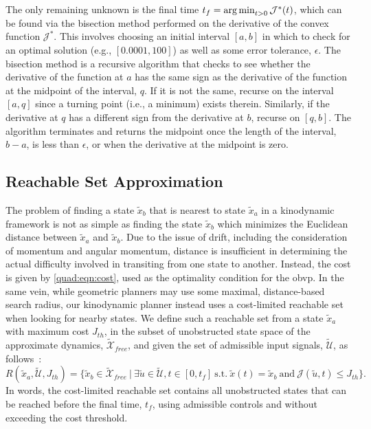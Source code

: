 The only remaining unknown is the final time $t_f = \operatorname*{arg\,min}_{t > 0} \mathcal{J}^*(t)$, which can be found via the bisection method performed on the derivative of the convex function $\mathcal{J}^*$. This involves choosing an initial interval $[a,b]$ in which to check for an optimal solution (e.g., $[0.0001, 100]$) as well as some error tolerance, $\epsilon$. The bisection method is a recursive algorithm that checks to see whether the derivative of the function at $a$ has the same sign as the derivative of the function at the midpoint of the interval, $q$. If it is not the same, recurse on the interval $[a,q]$ since a turning point (i.e., a minimum) exists therein. Similarly, if the derivative at $q$ has a different sign from the derivative at $b$, recurse on $[q,b]$. The algorithm terminates and returns the midpoint once the length of the interval, $b-a$, is less than $\epsilon$, or when the derivative at the midpoint is zero.




\subsection{Reachable Set Approximation}\label{quad:reachable_set}


The problem of finding a state $\tilde{x}_b$ that is nearest to state $\tilde{x}_a$ in a kinodynamic framework is not as simple as finding the state $\tilde{x}_b$ which minimizes the Euclidean distance between $\tilde{x}_a$ and $\tilde{x}_b$. Due to the issue of drift, including the consideration of momentum and angular momentum, distance is insufficient in determining the actual difficulty involved in transiting from one state to another. Instead, the cost is given by \autoref{quad:eqn:cost}, used as the optimality condition for the \gls{obvp}. In the same vein, while geometric planners may use some maximal, distance-based search radius, our kinodynamic planner instead uses a cost-limited reachable set when looking for nearby states. We define such a reachable set from a state $\tilde{x}_a$ with maximum cost $J_{th}$, in the subset of unobstructed state space of the approximate dynamics, $\mathcal{\tilde{X}}_{free}$, and given the set of admissible input signals, $\mathcal{\tilde{U}}$, as follows~\cite{Allen2014}:
\begin{equation}
    R(\tilde{x}_a, \mathcal{\tilde{U}}, J_{th}) = 
        \{ \tilde{x}_b \in \mathcal{\tilde{X}}_{free} \ \vert \ \exists \tilde{u} \in \mathcal{\tilde{U}}, t \in [0, t_f]\ \text{s.t.}\ \tilde{x}(t) = \tilde{x}_b\ \text{and}\ \mathcal{J}(\tilde{u},t) \leq J_{th} \}.
\end{equation}
In words, the cost-limited reachable set contains all unobstructed states that can be reached before the final time, $t_f$, using admissible controls and without exceeding the cost threshold.

